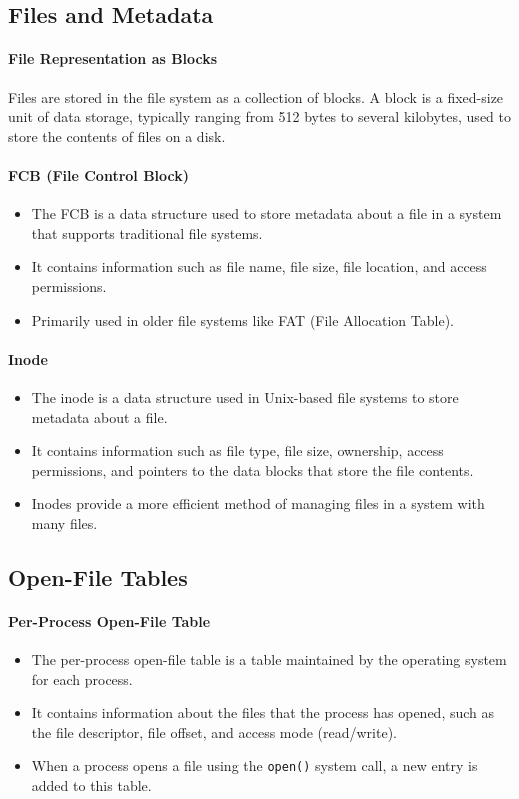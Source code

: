 \subsection{Files and Metadata}

\paragraph{File Representation as Blocks}
Files are stored in the file system as a collection of blocks. A block is a fixed-size unit of data storage, typically ranging from 512 bytes to several kilobytes, used to store the contents of files on a disk.

\paragraph{FCB (File Control Block)}
\begin{itemize}
    \item The FCB is a data structure used to store metadata about a file in a system that supports traditional file systems.
    \item It contains information such as file name, file size, file location, and access permissions.
    \item Primarily used in older file systems like FAT (File Allocation Table).
\end{itemize}

\paragraph{Inode}
\begin{itemize}
    \item The inode is a data structure used in Unix-based file systems to store metadata about a file.
    \item It contains information such as file type, file size, ownership, access permissions, and pointers to the data blocks that store the file contents.
    \item Inodes provide a more efficient method of managing files in a system with many files.
\end{itemize}


\subsection{Open-File Tables}

\paragraph{Per-Process Open-File Table}
\begin{itemize}
    \item The per-process open-file table is a table maintained by the operating system for each process.
    \item It contains information about the files that the process has opened, such as the file descriptor, file offset, and access mode (read/write).
    \item When a process opens a file using the \texttt{open()} system call, a new entry is added to this table.
\end{itemize}

